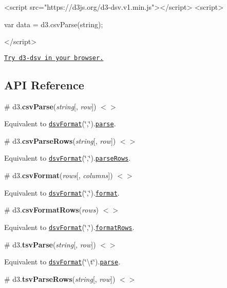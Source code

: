 \begin{DoxyCode}
<script src="https://d3js.org/d3-dsv.v1.min.js"></script>
<script>

var data = d3.csvParse(string);

</script>
\end{DoxyCode}


\href{https://tonicdev.com/npm/d3-dsv}{\tt Try d3-\/dsv in your browser.}

\subsection*{A\+PI Reference}

\label{_csvParse}%
\# d3.{\bfseries csv\+Parse}({\itshape string}\mbox{[}, {\itshape row}\mbox{]}) \href{https://github.com/d3/d3-dsv/blob/master/src/csv.js#L5}{\tt $<$$>$}

Equivalent to \href{#dsvFormat}{\tt dsv\+Format}(\char`\"{},\char`\"{}).\href{#dsv_parse}{\tt parse}.

\label{_csvParseRows}%
\# d3.{\bfseries csv\+Parse\+Rows}({\itshape string}\mbox{[}, {\itshape row}\mbox{]}) \href{https://github.com/d3/d3-dsv/blob/master/src/csv.js#L6}{\tt $<$$>$}

Equivalent to \href{#dsvFormat}{\tt dsv\+Format}(\char`\"{},\char`\"{}).\href{#dsv_parseRows}{\tt parse\+Rows}.

\label{_csvFormat}%
\# d3.{\bfseries csv\+Format}({\itshape rows}\mbox{[}, {\itshape columns}\mbox{]}) \href{https://github.com/d3/d3-dsv/blob/master/src/csv.js#L7}{\tt $<$$>$}

Equivalent to \href{#dsvFormat}{\tt dsv\+Format}(\char`\"{},\char`\"{}).\href{#dsv_format}{\tt format}.

\label{_csvFormatRows}%
\# d3.{\bfseries csv\+Format\+Rows}({\itshape rows}) \href{https://github.com/d3/d3-dsv/blob/master/src/csv.js#L8}{\tt $<$$>$}

Equivalent to \href{#dsvFormat}{\tt dsv\+Format}(\char`\"{},\char`\"{}).\href{#dsv_formatRows}{\tt format\+Rows}.

\label{_tsvParse}%
\# d3.{\bfseries tsv\+Parse}({\itshape string}\mbox{[}, {\itshape row}\mbox{]}) \href{https://github.com/d3/d3-dsv/blob/master/src/tsv.js#L5}{\tt $<$$>$}

Equivalent to \href{#dsvFormat}{\tt dsv\+Format}(\char`\"{}\textbackslash{}t\char`\"{}).\href{#dsv_parse}{\tt parse}.

\label{_tsvParseRows}%
\# d3.{\bfseries tsv\+Parse\+Rows}({\itshape string}\mbox{[}, {\itshape row}\mbox{]}) \href{https://github.com/d3/d3-dsv/blob/master/src/tsv.js#L6}{\tt $<$$>$}

